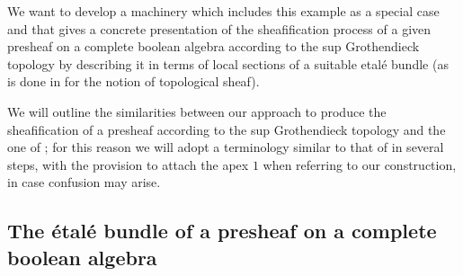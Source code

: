 \documentclass[11pt]{amsart}
\newcommand{\etale}{\textrm{Etale}}
\theoremstyle{plain}
\theoremstyle{definition}
\theoremstyle{plain}
\theoremstyle{remark}
\DeclareMathOperator{\St}{St}
\DeclareMathOperator{\RO}{\mathsf{RO}}
\newcommand{\0}{\mathsf{0}}
\renewcommand{\1}{\mathsf{1}}
\renewcommand{\2}{\mathsf{2}}
\theoremstyle{definition}
\begin{document}
We want to develop a machinery which includes this example as a special case and that gives a concrete presentation of the sheafification process of a given presheaf on a complete boolean algebra according to the sup Grothendieck topology by describing it in terms of local sections of a suitable etal\'e bundle (as is done in \cite[Section II.5]{MacLMoer} for the notion of topological sheaf).

We will outline the similarities between our approach to produce the sheafification of a presheaf according to the sup Grothendieck topology and the one of \cite[Chapter II]{MacLMoer}; for this reason we will adopt a terminology similar to that of \cite[Chapter II]{MacLMoer} in several steps, with the provision to attach the apex $1$ when referring to our construction, in case confusion may arise.




\subsection{The \'etal\'e bundle of a presheaf on a complete boolean algebra}





%
%
 
\end{document}
